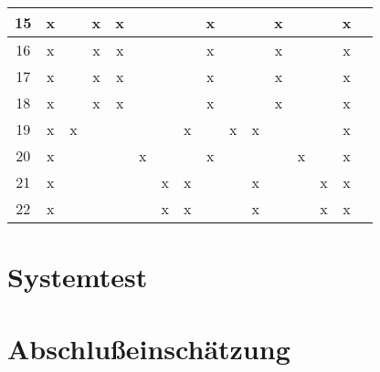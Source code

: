 \begin{longtable}{|c|c|c|c|c|c|c|c|c|c|c|c|c|c|c|c|}
15 & x &   & x & x &   &   &   & x &   &   & x &   &   & x &  \\\hline
16 & x &   & x & x &   &   &   & x &   &   & x &   &   & x &  \\\hline
17 & x &   & x & x &   &   &   & x &   &   & x &   &   & x &  \\\hline
18 & x &   & x & x &   &   &   & x &   &   & x &   &   & x &  \\\hline
19 & x & x &   &   &   &   & x &   & x & x &   &   &   & x &  \\\hline
20 & x &   &   &   & x &   &   & x &   &   &   & x &   & x &  \\\hline
21 & x &   &   &   &   & x & x &   &   & x &   &   & x & x &  \\\hline
22 & x &   &   &   &   & x & x &   &   & x &   &   & x & x &  \\\hline
\end{longtable}

\section{Systemtest}

\section{Abschlußeinschätzung}
